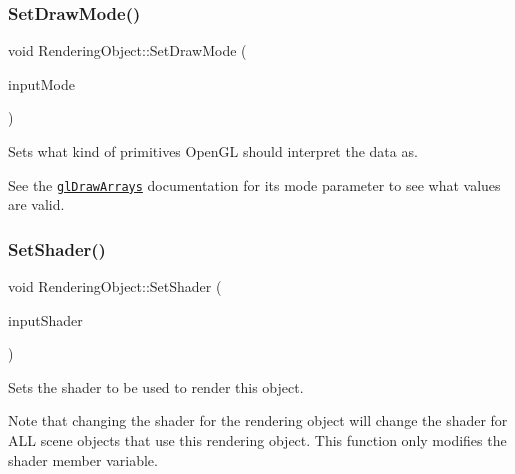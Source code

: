 \subsubsection{\texorpdfstring{Set\+Draw\+Mode()}{SetDrawMode()}}
{\footnotesize\ttfamily void Rendering\+Object\+::\+Set\+Draw\+Mode (\begin{DoxyParamCaption}\item[{G\+Lenum}]{input\+Mode }\end{DoxyParamCaption})\hspace{0.3cm}{\ttfamily [inline]}}



Sets what kind of primitives Open\+GL should interpret the data as.

See the \href{https://www.opengl.org/sdk/docs/man/html/glDrawArrays.xhtml}{\tt gl\+Draw\+Arrays} documentation for its \textquotesingle{}mode\textquotesingle{} parameter to see what values are valid. \hypertarget{class_rendering_object_a22311d08bb7559f6b913afe314a5031e}{}\label{class_rendering_object_a22311d08bb7559f6b913afe314a5031e}
\subsubsection{\texorpdfstring{Set\+Shader()}{SetShader()}}
{\footnotesize\ttfamily void Rendering\+Object\+::\+Set\+Shader (\begin{DoxyParamCaption}\item[{std\+::shared\+\_\+ptr$<$ class \hyperlink{class_shader_program}{Shader\+Program} $>$}]{input\+Shader }\end{DoxyParamCaption})\hspace{0.3cm}{\ttfamily [virtual]}}



Sets the shader to be used to render this object.

Note that changing the shader for the rendering object will change the shader for A\+LL scene objects that use this rendering object. This function only modifies the \textquotesingle{}shader\textquotesingle{} member variable. \hypertarget{class_rendering_object_a095317dd60a7558c22409e2fabcb252e}{}\label{class_rendering_object_a095317dd60a7558c22409e2fabcb252e}
